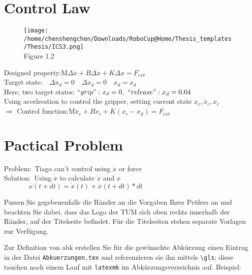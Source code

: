 \section{Control Law}

\begin{figure}[!ht]
\centering
\noindent\hspace{0.5mm}\texttt{[image: /home/chenshengchen/Downloads/RoboCup@Home/Thesis\_templates/Thesis/ICS3.png]}\\
\centering
Figure 1.2\\
\end{figure}

Designed property:\quad M$\Delta\ddot x+B\Delta\dot x+K\Delta x=F_{ext}$\\
\vspace{1 ex}
Target state:$\quad \Delta \ddot x_d = 0 \quad \Delta \dot x_d = 0\quad x_d = x_d$\\
\vspace{1 ex}
Here, two target states: $``grip": x_d = 0$,\ $``release": x_d = 0.04$\\
\vspace{1 ex}
Using accelreation to control the gripper, setting current state $\ddot x_c,  \dot x_c, x_c$\\
\vspace{1 ex}
$\Rightarrow$ Control function:\quad M$\ddot x_c+B\dot x_c+K(x_c-x_d)=F_{ext}$

\section{Pactical Problem}
Problem:\ Tiago can't control using $\ddot x$ or force\\
\vspace{1 ex}
Solution:\ Using $\ddot x$ to calculate $\dot x$ and $x$\\
\vspace{1 ex}
$\hspace{1cm} \quad \ \dot x{(t+dt)} = \dot x(t) + \ddot x(t+dt)*dt$

\clearpage

Passen Sie gegebenenfalls die Ränder an die Vorgaben Ihres Prüfers an und
beachten Sie dabei, dass das Logo der TUM sich oben rechts innerhalb der
Ränder, auf der Titelseite befindet. Für die Titelseiten stehen separate
Vorlagen zur Verfügung.

Zur Definition von \gls{abk} erstellen Sie für die gewünschte Abkürzung einen
Eintrag in der Datei \texttt{Abkuerzungen.tex} und referenzieren sie ihn
mittels \texttt{\textbackslash{}gls}; diese tauchen nach einem Lauf mit
\texttt{latexmk} im Abkürzungsverzeichnis auf. Beispiel:

